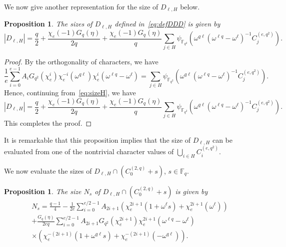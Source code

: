 \documentclass[10pt]{amsart}
\newtheorem{prop}[theo]{Proposition}
\theoremstyle{definition}
\newcommand*\F{{\mathbb F}}
\begin{document}
We now give another representation for the size of $D_{\ell,H}$ below.

\begin{prop}\label{prop:size_charac}
The sizes of $D_{\ell,H}$ defined in~\eqref{eq:defDDD} is given by
\[
|D_{\ell,H}|=\frac{q}{2}+\frac{\chi_e(-1)G_q(\eta)}{2q}+\frac{\chi_e(-1)G_q(\eta)}{q}\sum_{j\in H}\psi_{\F_{q^2}}(\omega^{q\ell}(\omega^{\ell q}-\omega^{\ell})^{-1}C_j^{(e,q^2)}).
\]
\end{prop}
\begin{proof}
By the orthogonality of characters, we have
\[
\frac{1}{e}\sum_{i=0}^{e-1} A_i G_{q^2}(\chi_e^{i})\chi_e^{-i}(\omega^{q\ell})\chi_e^{i}(\omega^{\ell q}-\omega^{\ell})=\sum_{j\in H}\psi_{\F_{q^2}}(\omega^{q\ell}(\omega^{\ell q}-\omega^{\ell})^{-1}C_j^{(e,q^2)}).
\]
Hence, continuing from~\eqref{eq:sizeH}, we have
\[
|D_{\ell,H}|=\frac{q}{2}+\frac{\chi_e(-1)G_q(\eta)}{2q}+\frac{\chi_e(-1)G_q(\eta)}{q}\sum_{j\in H}\psi_{\F_{q^2}}(\omega^{q\ell}(\omega^{\ell q}-\omega^{\ell})^{-1}C_j^{(e,q^2)}).
\]
This completes the proof.
\end{proof}

It is remarkable that this proposition implies that the size of $D_{\ell,H}$ can be evaluated from one of the nontrivial character values of $\bigcup_{i\in H}C_i^{(e,q^2)}$.

We now evaluate the sizes of $D_{\ell,H}\cap (C_0^{(2,q)}+s)$, $s\in \F_q$.

\begin{prop}\label{prop:size:int}
The size $N_s$ of $D_{\ell,H}\cap (C_0^{(2,q)}+s)$ is given by
\begin{multline}
N_s=\frac{q-1}{4}-\frac{1}{2e}\sum_{i=0}^{e/2-1} A_{2i+1}(\chi_e^{2i+1}(1+\omega^\ell s)+\chi_e^{2i+1}(\omega^\ell))\\
+\frac{G_q(\eta)}{2eq}\sum_{i=0}^{e/2-1}A_{2i+1} G_{q^2}(\chi_e^{2i+1})\chi_e^{2i+1}(\omega^{\ell q}-\omega^\ell)\\
\times (\chi_e^{-(2i+1)}(1+\omega^{q\ell} s)+\chi_e^{-(2i+1)}(-\omega^{q\ell})).\label{eq:sizeNs}
\end{multline}
\end{prop}
\end{document}
